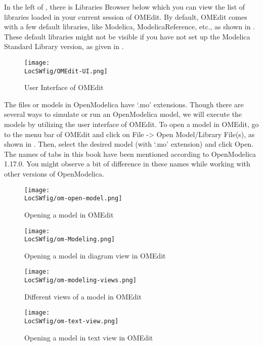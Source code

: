 In the left of , there is Libraries Browser below which you can view
the list of libraries loaded in your current session of OMEdit. By default, OMEdit 
comes with a few default libraries, like Modelica, ModelicaReference, etc., as shown in
. These default libraries might not be visible if you have not set up the
Modelica Standard Library version, as given in . 
\begin{figure}
      \centering
      \texttt{[image: \\LocSWfig/OMEdit-UI.png]}
      \caption{User Interface of OMEdit}
      \label{om-ui}
\end{figure}

The files or models in OpenModelica have `.mo' extensions. Though there are several ways to simulate or run 
an OpenModelica model, we will execute the models by utilizing the user interface of OMEdit. To open 
a model in OMEdit, go to the menu bar of OMEdit and click on File -> Open Model/Library File(s), as shown 
in . Then, select the desired model (with `.mo' extension) and click Open. The names of tabs in
this book have been mentioned according to OpenModelica 1.17.0. You might observe a bit
of difference in these names while working with other versions of OpenModelica. 

\begin{figure}
      \centering
      \texttt{[image: \\LocSWfig/om-open-model.png]}
      \caption{Opening a model in OMEdit}
      \label{om-model-open}
\end{figure}

\begin{figure}
      \centering
      \texttt{[image: \\LocSWfig/om-Modeling.png]}
      \caption{Opening a model in diagram view in OMEdit}
      \label{om-modeling}
\end{figure}


\begin{figure}
      \centering
      \texttt{[image: \\LocSWfig/om-modeling-views.png]}
      \caption{Different views of a model in OMEdit}
      \label{om-views}
\end{figure}


\begin{figure}
      \centering
      \texttt{[image: \\LocSWfig/om-text-view.png]}
      \caption{Opening a model in text view in OMEdit}
      \label{om-text-view}
\end{figure}

